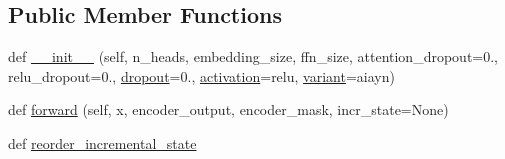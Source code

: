 \subsection*{Public Member Functions}
\begin{DoxyCompactItemize}
\item 
def \hyperlink{classparlai_1_1agents_1_1transformer_1_1modules_1_1TransformerDecoderLayer_ad893ac51805fd662173f777c91b2cca4}{\+\_\+\+\_\+init\+\_\+\+\_\+} (self, n\+\_\+heads, embedding\+\_\+size, ffn\+\_\+size, attention\+\_\+dropout=0., relu\+\_\+dropout=0., \hyperlink{classparlai_1_1agents_1_1transformer_1_1modules_1_1TransformerDecoderLayer_aba87c66e402b0cfdf196872c3f038d43}{dropout}=0., \hyperlink{classparlai_1_1agents_1_1transformer_1_1modules_1_1TransformerDecoderLayer_a33276633e128020853db98128f1d93c3}{activation}=\textquotesingle{}relu\textquotesingle{}, \hyperlink{classparlai_1_1agents_1_1transformer_1_1modules_1_1TransformerDecoderLayer_a94a9a714a2585fd6a675a08643e3ce6b}{variant}=\textquotesingle{}aiayn\textquotesingle{})
\item 
def \hyperlink{classparlai_1_1agents_1_1transformer_1_1modules_1_1TransformerDecoderLayer_a7b6ccf1e786de774f14397ec6368f342}{forward} (self, x, encoder\+\_\+output, encoder\+\_\+mask, incr\+\_\+state=None)
\item 
def \hyperlink{classparlai_1_1agents_1_1transformer_1_1modules_1_1TransformerDecoderLayer_a480d752ddd50f821078667af9f6ad20f}{reorder\+\_\+incremental\+\_\+state}
\end{DoxyCompactItemize}

